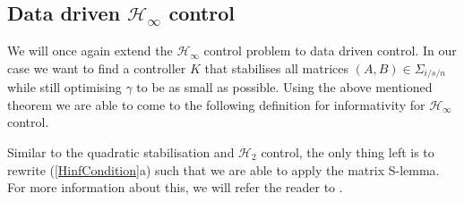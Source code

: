 \subsection{Data driven $\mathcal{H}_\infty$ control}
We will once again extend the $\mathcal{H}_\infty$ control problem to data driven control. In our case we want to find a controller $K$ that stabilises all matrices $(A,B) \in \Sigma_{i/s/n}$ while still optimising $\gamma$ to be as small as possible. Using the above mentioned theorem we are able to come to the following definition for informativity for $\mathcal{H}_\infty$ control.


Similar to the quadratic stabilisation and $\mathcal{H}_2$ control, the only thing left is to rewrite (\ref{HinfCondition}a) such that we are able to apply the matrix S-lemma. For more information about this, we will refer the reader to \cite[Section V.B]{waarde2020noisy}.





